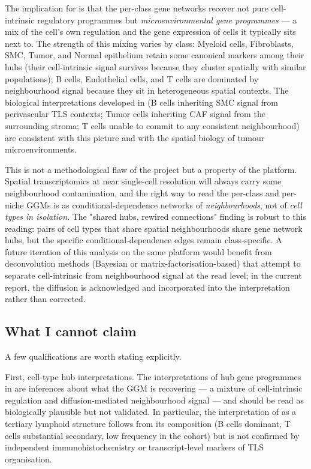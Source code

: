 The implication for  is that the per-class gene networks recover not pure cell-intrinsic regulatory programmes but \emph{microenvironmental gene programmes} --- a mix of the cell's own regulation and the gene expression of cells it typically sits next to. The strength of this mixing varies by class: Myeloid cells, Fibroblasts, SMC, Tumor, and Normal epithelium retain some canonical markers among their hubs (their cell-intrinsic signal survives because they cluster spatially with similar populations); B cells, Endothelial cells, and T cells are dominated by neighbourhood signal because they sit in heterogeneous spatial contexts. The biological interpretations developed in  (B cells inheriting SMC signal from perivascular TLS contexts; Tumor cells inheriting CAF signal from the surrounding stroma; T cells unable to commit to any consistent neighbourhood) are consistent with this picture and with the spatial biology of tumour microenvironments.

This is not a methodological flaw of the project but a property of the platform. Spatial transcriptomics at near single-cell resolution will always carry some neighbourhood contamination, and the right way to read the per-class and per-niche GGMs is as conditional-dependence networks of \emph{neighbourhoods}, not of \emph{cell types in isolation}. The "shared hubs, rewired connections" finding is robust to this reading: pairs of cell types that share spatial neighbourhoods share gene network hubs, but the specific conditional-dependence edges remain class-specific. A future iteration of this analysis on the same platform would benefit from deconvolution methods (Bayesian or matrix-factorisation-based) that attempt to separate cell-intrinsic from neighbourhood signal at the read level; in the current report, the diffusion is acknowledged and incorporated into the interpretation rather than corrected.

\subsection*{What I cannot claim}

A few qualifications are worth stating explicitly.

First, cell-type hub interpretations. The interpretations of hub gene programmes in  are inferences about what the GGM is recovering --- a mixture of cell-intrinsic regulation and diffusion-mediated neighbourhood signal --- and should be read as biologically plausible but not validated. In particular, the interpretation of  as a tertiary lymphoid structure follows from its composition (B cells dominant, T cells substantial secondary, low frequency in the cohort) but is not confirmed by independent immunohistochemistry or transcript-level markers of TLS organisation.

